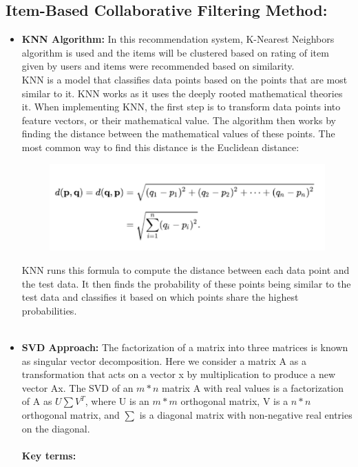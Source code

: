 \documentclass[10pt,conference]{IEEEtran}
\begin{document}
\subsection{\textbf{Item-Based Collaborative Filtering Method:}}
\begin{itemize}
	\item
		\textbf{KNN Algorithm:}
		In this recommendation system, K-Nearest Neighbors algorithm is used and the items will be clustered based on rating of item given by users and items were recommended based on similarity.\\
		KNN is a model that classifies data points based on the points that are most similar to it. KNN works as it uses the deeply rooted mathematical theories it. When implementing KNN, the first step is to transform data points into feature vectors, or their mathematical value. The algorithm then works by finding the distance between the mathematical values of these points. The most common way to find this distance is the Euclidean distance:
\begin{figure}[H]
\centering
\includegraphics[scale=.6]{knn.png}
\label{fig:KNN}
\end{figure}
KNN runs this formula to compute the distance between each data point and the test data. It then finds the probability of these points being similar to the test data and classifies it based on which points share the highest probabilities. \\\\
  \item \textbf{SVD Approach:}
The factorization of a matrix into three matrices is known as singular vector decomposition. Here we consider a matrix A as a transformation that acts on a vector x by multiplication to produce a new vector Ax. The SVD of an ${m{\ast}n}$ matrix A with real values is a factorization of A as ${U \sum V^{T}}$, where U is an ${m{\ast}m}$ orthogonal matrix, V is a ${n{\ast}n}$ orthogonal matrix, and $\sum$ is a diagonal matrix with non-negative real entries on the diagonal.\\\\
\textbf{Key terms:} 

\end{itemize}
\end{document}
